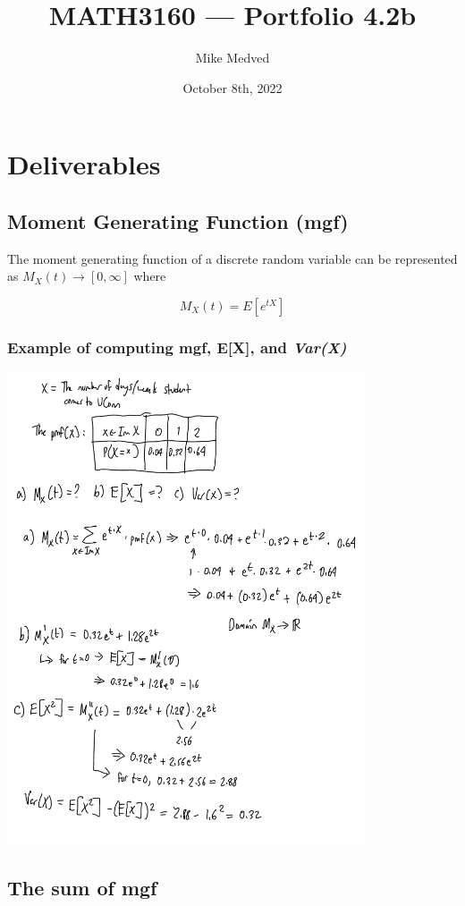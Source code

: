 \documentclass{article}
\title{MATH3160 — Portfolio 4.2b}
\author{Mike Medved}
\date{October 8th, 2022}
\begin{document}
\maketitle

\section{Deliverables}

\subsection{Moment Generating Function (mgf)}

The moment generating function of a discrete random variable can be represented as $M_X(t) \to \left[0, \infty\right]$ where

$$
M_X(t) = E\left[e^{tX}\right]
$$

\subsubsection{Example of computing mgf, E[X], and \textit{Var(X)}}

\includegraphics[height=5.5in]{example-mgf.jpeg}

\subsection{The sum of mgf}
\end{document}
